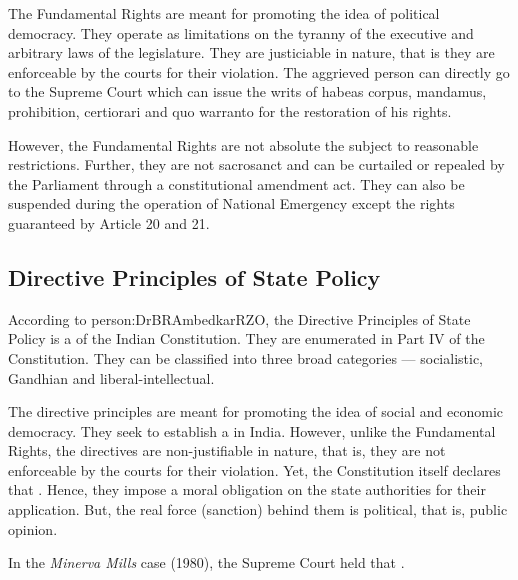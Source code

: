 The Fundamental Rights are meant for promoting the idea of political democracy. They operate as limitations on the tyranny of the executive and arbitrary laws of the legislature. They are justiciable in nature, that is they are enforceable by the courts for their violation. The aggrieved person can directly go to the Supreme Court which can issue the writs of { habeas corpus}, { mandamus}, prohibition, { certiorari} and { quo warranto} for the restoration of his rights.

However, the Fundamental Rights are not absolute the subject to reasonable restrictions. Further, they are not sacrosanct and can be curtailed or repealed by the Parliament through a constitutional amendment act. They can also be suspended during the operation of National Emergency except the rights guaranteed by Article 20 and 21.

\subsection{Directive Principles of State Policy}

According to \gls{person:DrBRAmbedkarRZO}, the Directive Principles of State Policy is a  of the Indian Constitution. They are enumerated in Part IV of the Constitution. They can be classified into three broad categories — socialistic, Gandhian and liberal-intellectual.

The directive principles are meant for promoting the idea of social and economic democracy. They seek to establish a  in India. However, unlike the Fundamental Rights, the directives are non-justifiable in nature, that is, they are not enforceable by the courts for their violation. Yet, the Constitution itself declares that . Hence, they impose a moral obligation on the state authorities for their application. But, the real force (sanction) behind them is political, that is, public opinion.

In the { \textit{Minerva Mills}} case (1980), the Supreme Court held that .

